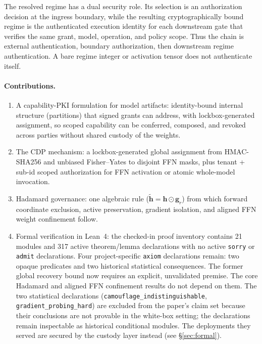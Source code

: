 \documentclass[11pt,a4paper]{article}
\newcommand{\bh}{\mathbf{h}}
\newcommand{\bg}{\mathbf{g}}
\begin{document}
The resolved regime has a dual security role.  Its selection is an
authorization decision at the ingress boundary, while the resulting
cryptographically bound regime is the authenticated execution identity
for each downstream gate that verifies the same grant, model, operation,
and policy scope.  Thus the chain is external authentication, boundary
authorization, then downstream regime authentication.  A bare regime
integer or activation tensor does not authenticate itself.

\paragraph{Contributions.}
\begin{enumerate}[nosep]
    \item A capability-PKI formulation for model artifacts:
    identity-bound internal structure (partitions) that signed grants
    can address, with lockbox-generated assignment, so scoped
    capability can be conferred, composed, and revoked across parties
    without shared custody of the weights.
    \item The CDP mechanism: a lockbox-generated global assignment
    from HMAC-SHA256 and unbiased Fisher--Yates to disjoint FFN masks,
    plus tenant + sub-id scoped authorization for FFN activation or
    atomic whole-model invocation.
    \item Hadamard governance: one algebraic rule
    ($\tilde{\bh} = \bh \odot \bg_r$) from which forward coordinate
    exclusion, active preservation, gradient isolation, and aligned
    FFN weight confinement follow.
    \item Formal verification in Lean~4: the checked-in proof
    inventory contains 21 modules and 317 active theorem/lemma declarations
    with no active \texttt{sorry} or \texttt{admit} declarations.  Four
    project-specific \texttt{axiom} declarations remain: two opaque
    predicates and two historical statistical consequences. The former
    global recovery bound now requires an explicit, unvalidated premise.  The core Hadamard and aligned FFN confinement
    results do not depend on them.  The two statistical declarations
    (\texttt{camouflage\_indistinguishable},
    \texttt{gradient\_probing\_hard}) are excluded from the paper's claim set
    because their conclusions are not provable in the white-box setting; the
    declarations remain inspectable as historical conditional modules.  The
    deployments they served are secured by the custody layer instead (see
    \S\ref{sec:formal}).

\end{enumerate}
\end{document}
